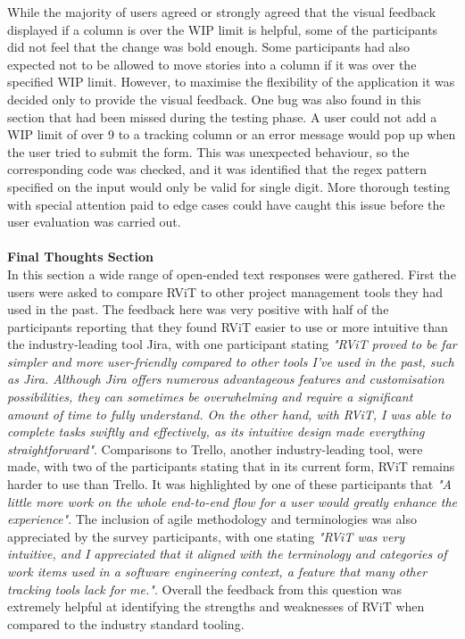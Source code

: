 \documentclass[l4proj.tex]{subfiles}
\begin{document}
While the majority of users agreed or strongly agreed that the visual feedback displayed if a column is over the WIP limit is helpful, some of the participants did not feel that the change was bold enough. Some participants had also expected not to be allowed to move stories into a column if it was over the specified WIP limit. However, to maximise the flexibility of the application it was decided only to provide the visual feedback. One bug was also found in this section that had been missed during the testing phase. A user could not add a WIP limit of over 9 to a tracking column or an error message would pop up when the user tried to submit the form. This was unexpected behaviour, so the corresponding code was checked, and it was identified that the regex pattern specified on the input would only be valid for single digit. More thorough testing with special attention paid to edge cases could have caught this issue before the user evaluation was carried out.\\
\\
\textbf{Final Thoughts Section}\\
In this section a wide range of open-ended text responses were gathered. First the users were asked to compare RViT to other project management tools they had used in the past. The feedback here was very positive with half of the participants reporting that they found RViT easier to use or more intuitive than the industry-leading tool Jira, with one participant stating \textit{"RViT proved to be far simpler and more user-friendly compared to other tools I've used in the past, such as Jira. Although Jira offers numerous advantageous features and customisation possibilities, they can sometimes be overwhelming and require a significant amount of time to fully understand. On the other hand, with RViT, I was able to complete tasks swiftly and effectively, as its intuitive design made everything straightforward"}. Comparisons to Trello, another industry-leading tool, were made, with two of the participants stating that in its current form, RViT remains harder to use than Trello. It was highlighted by one of these participants that \textit{"A little more work on the whole end-to-end flow for a user would greatly enhance the experience"}. The inclusion of agile methodology and terminologies was also appreciated by the survey participants, with one stating \textit{"RViT was very intuitive, and I appreciated that it aligned with the terminology and categories of work items used in a software engineering context, a feature that many other tracking tools lack for me."}. Overall the feedback from this question was extremely helpful at identifying the strengths and weaknesses of RViT when compared to the industry standard tooling.
\end{document}
